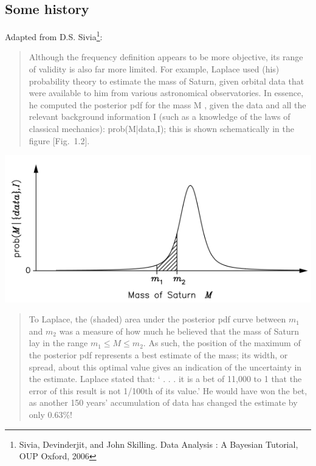 \documentclass[%
oneside,                 %
final,                   %
10pt]{article}
\begin{document}
\subsection{Some history}
Adapted from D.S. Sivia\footnote{Sivia, Devinderjit, and John Skilling. Data Analysis : A Bayesian Tutorial, OUP Oxford, 2006}:




\begin{quote}
Although the frequency definition appears to be more objective, its range of validity is also far more limited. For example, Laplace used (his) probability theory to estimate the mass of Saturn, given orbital data that were available to him from various astronomical observatories. In essence, he computed the posterior pdf for the mass M , given the data and all the relevant background information I (such as a knowledge of the laws of classical mechanics): prob(M|{data},I); this is shown schematically in the figure [Fig.~1.2].
\end{quote}




\vspace{6mm}

\centerline{\includegraphics[width=0.9\linewidth]{fig/sivia_fig_1_2.png}}

\vspace{6mm}




\begin{quote}
To Laplace, the (shaded) area under the posterior pdf curve between $m_1$ and $m_2$ was a measure of how much he believed that the mass of Saturn lay in the range $m_1 \le M \le m_2$. As such, the position of the maximum of the posterior pdf represents a best estimate of the mass; its width, or spread, about this optimal value gives an indication of the uncertainty in the estimate. Laplace stated that: ‘ . . . it is a bet of 11,000 to 1 that the error of this result is not 1/100th of its value.’ He would have won the bet, as another 150 years’ accumulation of data has changed the estimate by only 0.63\%!
\end{quote}
\end{document}
